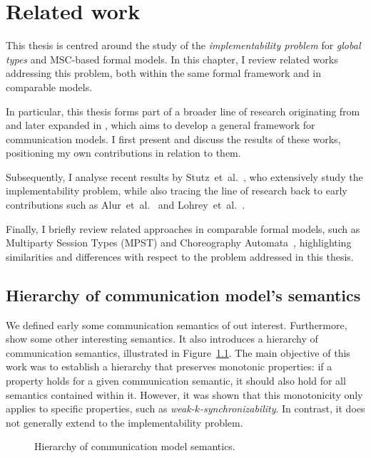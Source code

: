 
\chapter{Related work}\label{sec:rel}
This thesis is centred around the study of the \emph{implementability 
problem} for \emph{global types} and MSC-based formal models.  
In this chapter, I review related works addressing this problem, 
both within the same formal framework and in comparable models.  

In particular, this thesis forms part of a broader line of research 
originating from~\cite{di2023partial} and later expanded in 
\cite{di2025realisability}, which aims to develop a general framework 
for communication models. I first present and discuss the results of 
these works, positioning my own contributions in relation to them.  

Subsequently, I analyse recent results by 
Stutz~et~al.~\cite{stutz2024implementability}, who extensively study 
the implementability problem, while also tracing the line of research 
back to early contributions such as Alur~et~al.~\cite{alur2000inference} 
and Lohrey~et~al.~\cite{lohrey2003realizability}.  

Finally, I briefly review related approaches in comparable formal 
models, such as Multiparty Session Types (MPST) and Choreography 
Automata~\cite{barbanera2020choreography}, highlighting similarities 
and differences with respect to the problem addressed in this thesis.

\section{Hierarchy of communication model's semantics}\label{sec:hier}
We defined early some communication semantics of out interest.
Furthermore, \cite{di2023partial} show some other interesting 
semantics. It also introduces a hierarchy of communication
semantics, illustrated in Figure~\ref{fig:coms}. The main objective of
this work was to establish a hierarchy that preserves monotonic
properties: if a property holds for a given communication semantic, it
should also hold for all semantics contained within it. However, it was
shown that this monotonicity only applies to specific properties, such
as \emph{weak-$k$-synchronizability}. In contrast, it does not generally
extend to the implementability problem.

\begin{figure}[!ht]
\centering
{}
\caption{Hierarchy of communication model semantics.}
\label{fig:coms}
\end{figure}

